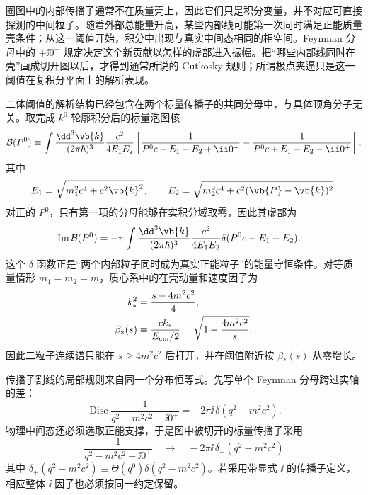 圈图中的内部传播子通常不在质量壳上，因此它们只是积分变量，并不对应可直接探测的中间粒子。随着外部总能量升高，某些内部线可能第一次同时满足正能质量壳条件；从这一阈值开始，积分中出现与真实中间态相同的相空间。Feynman 分母中的 $+\ii0^+$ 规定决定这个新贡献以怎样的虚部进入振幅。把“哪些内部线同时在壳”画成切开图以后，才得到通常所说的 Cutkosky 规则；所谓极点夹逼只是这一阈值在复积分平面上的解析表现。


二体阈值的解析结构已经包含在两个标量传播子的共同分母中，与具体顶角分子无关。取完成 $k^0$ 轮廓积分后的标量泡图核
\begin{equation}
 \mathcal B(P^0)
 \equiv
 \int\frac{\dd^3 \vb{k}}{(2\pi\hbar)^3}
 \frac{c^2}{4E_1E_2}
 \left[
 \frac{1}{P^0c-E_1-E_2+\ii0^+}
 -\frac{1}{P^0c+E_1+E_2-\ii0^+}
 \right],
 \label{eq:qft-bubble-after-k0-dp8}
\end{equation}
其中
\begin{equation*}
 E_1=\sqrt{m_1^2c^4+c^2\vb{k}^2},
 \qquad
 E_2=\sqrt{m_2^2c^4+c^2(\vb{P}-\vb{k})^2}.
\end{equation*}
对正的 $P^0$，只有第一项的分母能够在实积分域取零，因此其虚部为
\begin{align}
 \operatorname{Im}\mathcal B(P^0)
 &=-\pi
 \int\frac{\dd^3 \vb{k}}{(2\pi\hbar)^3}
 \frac{c^2}{4E_1E_2}
 \delta(P^0c-E_1-E_2).
 \label{eq:bubble-imag-phase-space-dp8}
\end{align}
这个 $\delta$ 函数正是“两个内部粒子同时成为真实正能粒子”的能量守恒条件。对等质量情形 $m_1=m_2=m$，质心系中的在壳动量和速度因子为
\begin{align}
 k_*^2
 &=\frac{s-4m^2c^2}{4},\\
 \beta_*(s)
 &\equiv\frac{ck_*}{E_{\rm cm}/2}
 =\sqrt{1-\frac{4m^2c^2}{s}}.
 \label{eq:two-body-threshold-beta-dp8}
\end{align}
因此二粒子连续谱只能在 $s\ge4m^2c^2$ 后打开，并在阈值附近按 $\beta_*(s)$ 从零增长。

传播子割线的局部规则来自同一个分布恒等式。先写单个 Feynman 分母跨过实轴的差：
\begin{equation}
 \operatorname{Disc}\frac1{q^2-m^2c^2+\ii0^+}
 =-2\pi\ii\,\delta(q^2-m^2c^2).
 \label{eq:feynman-denominator-discontinuity-dp68}
\end{equation}
物理中间态还必须选取正能支撑，于是图中被切开的标量传播子采用
\begin{equation}
 {
 \frac1{q^2-m^2c^2+\ii0^+}
 \quad\longrightarrow\quad
 -2\pi\ii\,\delta_+(q^2-m^2c^2)}
 \label{eq:cutkosky-propagator-rule-dp8}
\end{equation}
其中 $\delta_+(q^2-m^2c^2)\equiv\Theta(q^0)\delta(q^2-m^2c^2)$。若采用带显式 $\ii$ 的传播子定义，相应整体 $\ii$ 因子也必须按同一约定保留。

